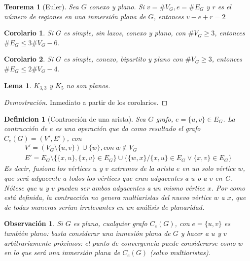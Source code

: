 \documentclass{article}
\newtheorem{lemma}{Lema}
\newtheorem{theorem}{Teorema}
\newtheorem*{definition}{Definicion}
\newtheorem*{obs}{Observación}
\newtheorem*{corollary}{Corolario}
\newtheorem*{notacion}{Notación}
\begin{document}
\begin{theorem}[Euler]
Sea $G$ conexo y plano. Si $v = \#V_G, e =  \#E_G$ y $r$ es el número de regiones en una inmersión plana de $G$, entonces $v - e + r = 2$
\end{theorem}

\begin{corollary}
Si $G$ es simple, sin lazos, conexo y plano, con $\#V_G \ge 3$, entonces $\#E_G \le 3\#V_G - 6$.
\end{corollary}

\begin{corollary}
Si $G$ es simple, conexo, bipartito y plano con $\#V_G \ge 3$, entonces $\#E_G \le 2\#V_G - 4$.
\end{corollary}

\begin{lemma}
$K_{3,3}$ y $K_5$ no son planos.
\end{lemma}

\begin{proof}[Demostración]
Inmediato a partir de los corolarios.

\end{proof}


\begin{definition}[Contracción de una arista]
Sea $G$ grafo, $e = \{u,v\} \in E_G$. La contracción de $e$ es una operación que da como resultado el grafo     $C_e(G) = (V', E')$, con
\begin{gather*}
    V' = (V_G \setminus \{u, v\}) \cup \{w\}, con \ w \notin V_G\\
    E' = E_G \setminus \{\{x,u\},\{x,v\} \in E_G\} \cup \{\{w,x\} / \{x,u\} \in E_G \vee \{x,v\} \in E_G\}
\end{gather*}
Es decir, fusiona los vértices $u$ y $v$ extremos de la arista $e$ en un solo vértice $w$, que será adyacente a todos los vértices que eran adyacentes a $u$ o a $v$ en G. Nótese que $u$ y $v$ pueden ser ambos adyacentes a un mismo vértice $x$. Por como está definida, la contracción no genera multiaristas del nuevo vértice $w$ a $x$, que de todas maneras serían irrelevantes en un análisis de planaridad.
\end{definition}


\begin{obs}
Si $G$ es plano, cualquier grafo $C_e(G)$, con $e = \{u,v\}$ es también plano: basta considerar una inmesión plana de $G$ y hacer a $u$ y $v$ arbitrariamente próximos: el punto de convergencia puede considerarse como $w$ en lo que será una inmersión plana de $C_e(G)$ (salvo multiaristas).
\end{obs}
\end{document}
